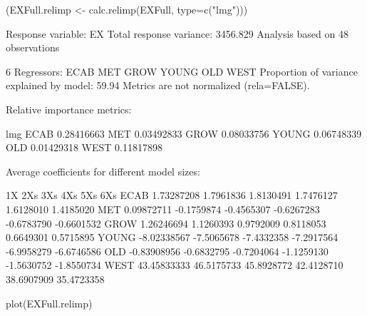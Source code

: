 \begin{Schunk}
\begin{Sinput}
 (EXFull.relimp <- calc.relimp(EXFull, type=c("lmg"))) 
\end{Sinput}
\begin{Soutput}
Response variable: EX 
Total response variance: 3456.829 
Analysis based on 48 observations 

6 Regressors: 
ECAB MET GROW YOUNG OLD WEST 
Proportion of variance explained by model: 59.94%
Metrics are not normalized (rela=FALSE). 

Relative importance metrics: 

             lmg
ECAB  0.28416663
MET   0.03492833
GROW  0.08033756
YOUNG 0.06748339
OLD   0.01429318
WEST  0.11817898

Average coefficients for different model sizes: 

               1X        2Xs        3Xs        4Xs        5Xs        6Xs
ECAB   1.73287208  1.7961836  1.8130491  1.7476127  1.6128010  1.4185020
MET    0.09872711 -0.1759874 -0.4565307 -0.6267283 -0.6783790 -0.6601532
GROW   1.26246694  1.1260393  0.9792009  0.8118053  0.6649301  0.5715895
YOUNG -8.02338567 -7.5065678 -7.4332358 -7.2917564 -6.9958279 -6.6746586
OLD   -0.83908956 -0.6832795 -0.7204064 -1.1259130 -1.5630752 -1.8550734
WEST  43.45833333 46.5175733 45.8928772 42.4128710 38.6907909 35.4723358
\end{Soutput}
\begin{Sinput}
 plot(EXFull.relimp)
\end{Sinput}
\end{Schunk}
